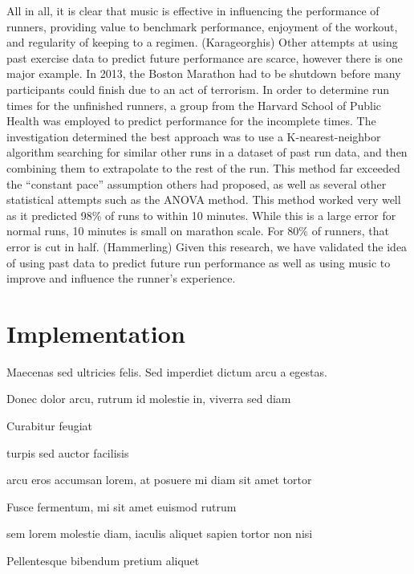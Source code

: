 \documentclass[twoside]{article}
\begin{document}
\begin{multicols}{2}
	All in all, it is clear that music is effective in influencing the performance of runners, providing value to benchmark performance, enjoyment of the workout, and regularity of keeping to a regimen. (Karageorghis)
	Other attempts at using past exercise data to predict future performance are scarce, however there is one major example. In 2013, the Boston Marathon had to be shutdown before many participants could finish due to an act of terrorism. In order to determine run times for the unfinished runners, a group from the Harvard School of Public Health was employed to predict performance for the incomplete times. The investigation determined the best approach was to use a K-nearest-neighbor algorithm searching for similar other runs in a dataset of past run data, and then combining them to extrapolate to the rest of the run. This method far exceeded the “constant pace” assumption others had proposed, as well as several other statistical attempts such as the ANOVA method. This method worked very well as it predicted 98\% of runs to within 10 minutes. While this is a large error for normal runs, 10 minutes is small on marathon scale. For 80\% of runners, that error is cut in half. (Hammerling)
	Given this research, we have validated the idea of using past data to predict future run performance as well as using music to improve and influence the runner’s experience. 


\section{Implementation}

Maecenas sed ultricies felis. Sed imperdiet dictum arcu a egestas. 
\begin{compactitem}
\item Donec dolor arcu, rutrum id molestie in, viverra sed diam
\item Curabitur feugiat
\item turpis sed auctor facilisis
\item arcu eros accumsan lorem, at posuere mi diam sit amet tortor
\item Fusce fermentum, mi sit amet euismod rutrum
\item sem lorem molestie diam, iaculis aliquet sapien tortor non nisi
\item Pellentesque bibendum pretium aliquet
\end{compactitem}


\end{multicols}
\end{document}
